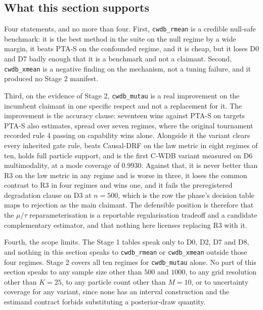 \subsection{What this section supports}

Four statements, and no more than four. First, \texttt{cwdb\_rmean} is a
credible null-safe benchmark: it is the best method in the suite on the null
regime by a wide margin, it beats PTA-S on the confounded regime, and it is
cheap, but it loses D0 and D7 badly enough that it is a benchmark and not a
claimant. Second, \texttt{cwdb\_xmean} is a negative finding on the mechanism,
not a tuning failure, and it produced no Stage 2 manifest.

Third, on the evidence of Stage 2, \texttt{cwdb\_mutau} is a real improvement on
the incumbent claimant in one specific respect and not a replacement for it. The
improvement is the accuracy clause: seventeen wins against PTA-S on targets
PTA-S also estimates, spread over seven regimes, where the original tournament
recorded rule 4 passing on capability wins alone. Alongside it the variant
clears every inherited gate rule, beats Causal-DRF on the law metric in eight
regimes of ten, holds full particle support, and is the first C-WDB variant
measured on D6 multimodality, at a mode coverage of $0.9930$. Against that, it
is never better than R3 on the law metric in any regime and is worse in three,
it loses the common contrast to R3 in four regimes and wins one, and it fails
the preregistered degradation clause on D3 at $n = 500$, which is the row the
phase's decision table maps to rejection as the main claimant. The defensible
position is therefore that the $\mu/\tau$ reparameterisation is a reportable
regularisation tradeoff and a candidate complementary estimator, and that
nothing here licenses replacing R3 with it.

Fourth, the scope limits. The Stage 1 tables speak only to D0, D2, D7 and D8,
and nothing in this section speaks to \texttt{cwdb\_rmean} or
\texttt{cwdb\_xmean} outside those four regimes. Stage 2 covers all ten regimes
for \texttt{cwdb\_mutau} alone. No part of this section speaks to any sample
size other than $500$ and $1000$, to any grid resolution other than $K = 25$, to
any particle count other than $M = 10$, or to uncertainty coverage for any
variant, since none has an interval construction and the estimand contract
forbids substituting a posterior-draw quantity.



